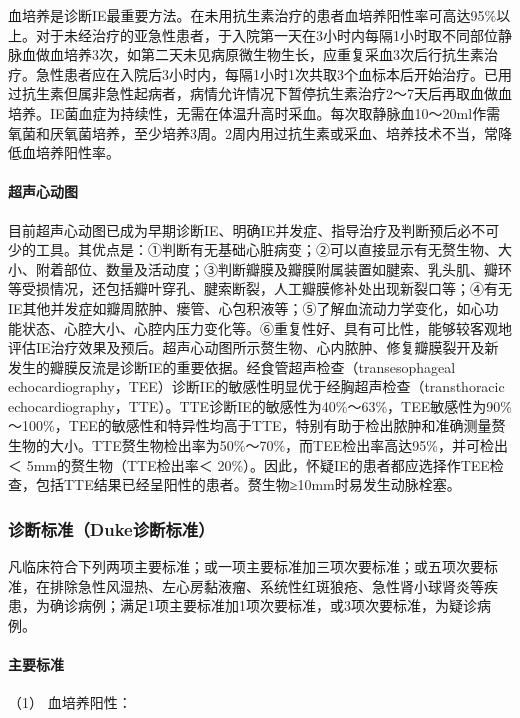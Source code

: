血培养是诊断IE最重要方法。在未用抗生素治疗的患者血培养阳性率可高达95\%以上。对于未经治疗的亚急性患者，于入院第一天在3小时内每隔1小时取不同部位静脉血做血培养3次，如第二天未见病原微生物生长，应重复采血3次后行抗生素治疗。急性患者应在入院后3小时内，每隔1小时1次共取3个血标本后开始治疗。已用过抗生素但属非急性起病者，病情允许情况下暂停抗生素治疗2～7天后再取血做血培养。IE菌血症为持续性，无需在体温升高时采血。每次取静脉血10～20ml作需氧菌和厌氧菌培养，至少培养3周。2周内用过抗生素或采血、培养技术不当，常降低血培养阳性率。

\paragraph{超声心动图}

目前超声心动图已成为早期诊断IE、明确IE并发症、指导治疗及判断预后必不可少的工具。其优点是：①判断有无基础心脏病变；②可以直接显示有无赘生物、大小、附着部位、数量及活动度；③判断瓣膜及瓣膜附属装置如腱索、乳头肌、瓣环等受损情况，还包括瓣叶穿孔、腱索断裂，人工瓣膜修补处出现新裂口等；④有无IE其他并发症如瓣周脓肿、瘘管、心包积液等；⑤了解血流动力学变化，如心功能状态、心腔大小、心腔内压力变化等。⑥重复性好、具有可比性，能够较客观地评估IE治疗效果及预后。超声心动图所示赘生物、心内脓肿、修复瓣膜裂开及新发生的瓣膜反流是诊断IE的重要依据。经食管超声检查（transesophageal
echocardiography，TEE）诊断IE的敏感性明显优于经胸超声检查（transthoracic
echocardiography，TTE）。TTE诊断IE的敏感性为40\%～63\%，TEE敏感性为90\%～100\%，TEE的敏感性和特异性均高于TTE，特别有助于检出脓肿和准确测量赘生物的大小。TTE赘生物检出率为50\%～70\%，而TEE检出率高达95\%，并可检出＜
5mm的赘生物（TTE检出率＜
20\%）。因此，怀疑IE的患者都应选择作TEE检查，包括TTE结果已经呈阳性的患者。赘生物≥10mm时易发生动脉栓塞。

\subsubsection{诊断标准（Duke诊断标准）}

凡临床符合下列两项主要标准；或一项主要标准加三项次要标准；或五项次要标准，在排除急性风湿热、左心房黏液瘤、系统性红斑狼疮、急性肾小球肾炎等疾患，为确诊病例；满足1项主要标准加1项次要标准，或3项次要标准，为疑诊病例。

\paragraph{主要标准}

\hypertarget{text00300.htmlux5cux23CHP10-3-2-4-1-1}{}
（1） 血培养阳性：

